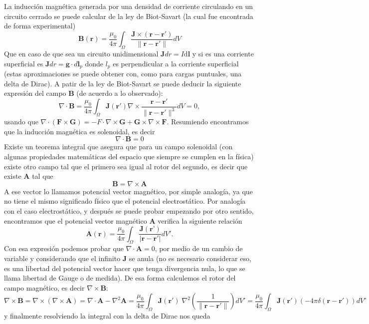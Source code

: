 \documentclass[11pt,a4paper]{article}
\numberwithin{equation}{section}
\begin{document}
La inducción magnética generada por una densidad de corriente circulando en un circuito cerrado se puede calcular de la ley de Biot-Savart (la cual fue encontrada de forma experimental)
\begin{equation}
    \textbf{B}(\textbf{r}) = \frac{\mu_0}{4\pi} \int_\Omega \frac{\textbf{J} \times (\textbf{r} - \textbf{r}')}{\|\textbf{r} - \textbf{r}'\|} dV
    \label{eq:biot_savart}
\end{equation}
Que en caso de que sea un circuito unidimensional $\textbf{J} dr = I \mathrm{d}\textbf{l}$ y si es una corriente superficial es $\textbf{J} dr = \textbf{g} \cdot d\textbf{l}_p$ donde $l_{p}$ es perpendicular a la corriente superficial (estas aproximaciones se puede obtener con, como para cargas puntuales, una delta de Dirac). A patir de la ley de Biot-Savart se puede deducir la siguiente expresión del campo $\textbf{B}$ (de acuerdo a lo observado): \[ \nabla \cdot \textbf{B} = \frac{\mu_0}{4\pi} \int_{\Omega} \textbf{J}(\textbf{r}') \nabla \times \frac{\textbf{r} - \textbf{r}'}{\|\textbf{r} - \textbf{r}'\|^3} dV = 0,\] usando que $\nabla \cdot (\textbf{F} \times \textbf{G}) = - F \cdot \nabla \times \textbf{G} + \textbf{G} \times \nabla \times \textbf{F}$. Resumiendo encontramos que la inducción magnética es solenoidal, es decir
\begin{equation}
    \nabla \cdot \textbf{B} = 0
    \label{eq:m_gauss_diff}
\end{equation}
Existe un teorema integral que asegura que para un campo solenoidal (con algunas propiedades matemáticas del espacio que siempre se cumplen en la física) existe otro campo tal que el primero sea igual al rotor del segundo, es decir que existe $\textbf{A}$ tal que 
\begin{equation}
    \textbf{B} = \nabla \times \textbf{A}
    \label{eq:m_potencial_vector}
\end{equation} 
A ese vector lo llamamos potencial vector magnético, por simple analogía, ya que no tiene el mismo significado físico que el potencial electrostático. Por analogía con el caso electrostático, y después se puede probar empezando por otro sentido, encontramos que el potencial vector magnético $\textbf{A}$ verifica la siguiente relación
\begin{equation}
    \textbf{A}(\textbf{r}) = \frac{\mu_0}{4\pi} \int_\Omega \frac{\textbf{J}(\textbf{r'})}{|\textbf{r} - \textbf{r}'|} dV'.
    \label{eq:m_potencial_vector_int}
\end{equation}
Con esa expresión podemos probar que $\nabla \cdot \textbf{A} = 0$, por medio de un cambio de variable y considerando que el infinito $\textbf{J}$ se anula (no es necesario considerar eso, es una libertad del potencial vector hacer que tenga divergencia nula, lo que se llama libertad de Gauge o de medida). De esa forma calculemos el rotor del campo magnético, es decir $\nabla \times \textbf{B}$: \[\nabla \times \textbf{B} = \nabla \times (\nabla \times \textbf{A}) = \nabla \cdot \textbf{A} - \nabla^2 \textbf{A} = \frac{\mu_0}{4\pi} \int_{\Omega} \textbf{J}(\textbf{r}')\; \nabla^2 \left(\frac{1}{\|\textbf{r} - \textbf{r}'\|}\right) dV' = \frac{\mu_0}{4\pi} \int_{\Omega} \textbf{J}(\textbf{r}') (-4\pi \delta(\textbf{r} - \textbf{r}') ) dV'\] y finalmente resolviendo la integral con la delta de Dirac nos queda
\end{document}
